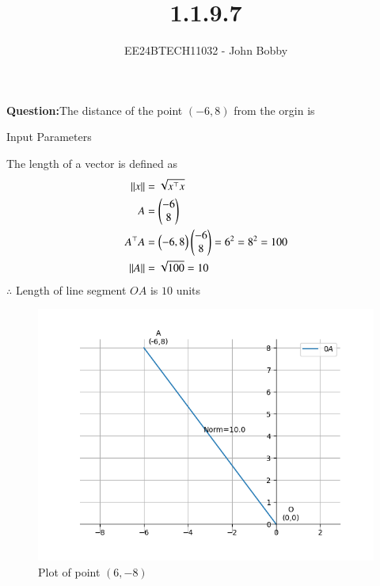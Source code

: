 \documentclass[journal]{IEEEtran}
\begin{document}

\vspace{3cm}
\title{1.1.9.7}
\author{EE24BTECH11032 - John Bobby}
{\let\newpage\relax\maketitle}

\renewcommand{\thefigure}{\theenumi}
\renewcommand{\thetable}{\theenumi}
\setlength{\intextsep}{10pt} %


\renewcommand{\thetable}{\theenumi}


\textbf{Question:}The distance of the point $(-6,8)$ from the orgin is\\
\begin{table}[h!]    
  \centering
  
  \caption{Input Parameters}
  \label{tab1.1.9.7}
\end{table}
\solution The length of a vector is defined as\\
\begin{align}
	\left\lVert x\right\rVert &= \sqrt{x^\top x}\\
	A &=\begin{pmatrix}-6\\8\end{pmatrix} \\
	A^\top A &=\begin{pmatrix}-6, 8\end{pmatrix}\begin{pmatrix}-6\\8\end{pmatrix} = 6^2=8^2=100\\
	\left\lVert A\right\rVert &= \sqrt{100}=10
\end{align}
$\therefore$ Length of line segment $OA$ is $10$ units
\begin{figure}[h!]
                \centering
               \includegraphics[width=0.7\linewidth]{Figs/Fig1.png}
			\caption{Plot of point $(6,-8)$}
               \label{stemplot}
               \end{figure}
\end{document}
